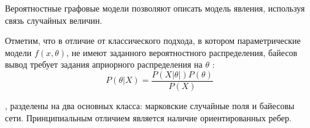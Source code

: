 Вероятностные графовые модели позволяют описать модель явления, используя связь случайных величин.





Отметим, что в отличие от классического подхода, в котором параметрические модели $f(x,\theta)$, не имеют заданного
вероятностного распределения, байесов вывод требует задания априорного распределения на $\theta$ :
\begin{equation}
    P(\theta | X) = \frac{P(X| \theta|) P(\theta)}{P(X)}
\end{equation}

, разделены на два основных класса: марковские случайные поля и байесовы сети.
Принципиальным отличием является наличие ориентированных ребер.








